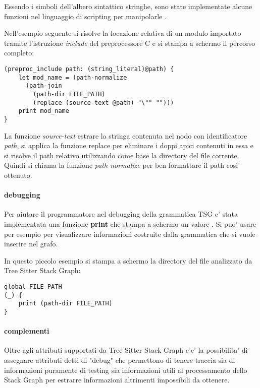 Essendo i simboli dell'albero sintattico stringhe, sono state implementate alcune funzioni nel linguaggio di scripting per manipolarle \cite{TreeSitterGraphReferenceFunctions} \cite{TreeSitterStackGraphPaths}.

Nell'esempio seguente si risolve la locazione relativa di un modulo importato tramite l'istruzione \emph{include} del preprocessore C e si stampa a schermo il percorso completo:

\begin{Verbatim}[samepage=true]
(preproc_include path: (string_literal)@path) {
    let mod_name = (path-normalize
      (path-join
        (path-dir FILE_PATH)
        (replace (source-text @path) "\"" "")))
    print mod_name
}
\end{Verbatim}

La funzione \emph{source-text} estrare la stringa contenuta nel nodo con identificatore \emph{path}, si applica la funzione replace per eliminare i doppi apici contenuti in essa e si risolve il path relativo utilizzando come base la directory del file corrente.
Quindi si chiama la funzione \emph{path-normalize} per ben formattare il path cosi' ottenuto.

\paragraph{debugging}

Per aiutare il programmatore nel debugging della grammatica TSG e' stata implementata una funzione \textbf{print} che stampa a schermo un valore \cite{TreeSitterGraphReferenceDebugging}.
Si puo' usare per esempio per visualizzare informazioni costruite dalla grammatica che si vuole inserire nel grafo.

In questo piccolo esempio si stampa a schermo la directory del file analizzato da Tree Sitter Stack Graph:

\begin{Verbatim}[samepage=true]
global FILE_PATH
(_) {
    print (path-dir FILE_PATH)
}
\end{Verbatim}

\paragraph{complementi}

Oltre agli attributi supportati da Tree Sitter Stack Graph c'e' la possibilita' di assegnare attributi detti di "debug" \cite{TreeSitterStackGraphDebugInfo} che permettono di tenere traccia sia di informazioni puramente di testing sia informazioni utili al processamento dello Stack Graph per estrarre informazioni altrimenti impossibili da ottenere.

